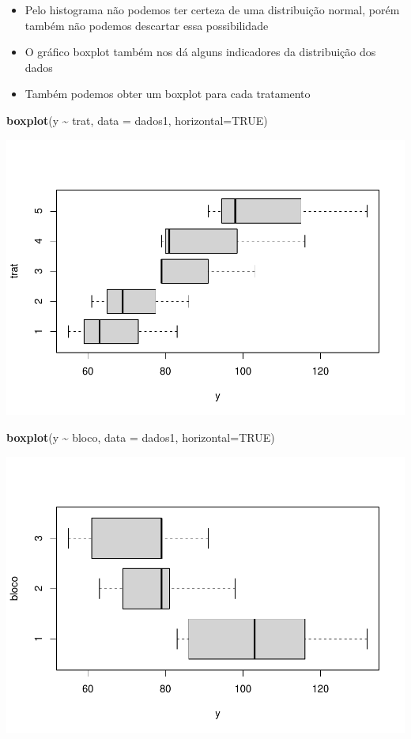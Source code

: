 \documentclass[
]{book}
\newenvironment{Shaded}{\begin{snugshade}}{\end{snugshade}}
\newcommand{\AttributeTok}[1]{\textcolor[rgb]{0.13,0.29,0.53}{#1}}
\newcommand{\ConstantTok}[1]{\textcolor[rgb]{0.56,0.35,0.01}{#1}}
\newcommand{\FunctionTok}[1]{\textcolor[rgb]{0.13,0.29,0.53}{\textbf{#1}}}
\newcommand{\NormalTok}[1]{#1}
\newcommand{\SpecialCharTok}[1]{\textcolor[rgb]{0.81,0.36,0.00}{\textbf{#1}}}
\begin{document}
\begin{itemize}
\item
  Pelo histograma não podemos ter certeza de uma distribuição normal, porém também não podemos descartar essa possibilidade
\item
  O gráfico boxplot também nos dá alguns indicadores da distribuição dos dados
\item
  Também podemos obter um boxplot para cada tratamento
\end{itemize}

\begin{Shaded}
\begin{Highlighting}[]
\FunctionTok{boxplot}\NormalTok{(y }\SpecialCharTok{\textasciitilde{}}\NormalTok{ trat, }\AttributeTok{data =}\NormalTok{ dados1, }\AttributeTok{horizontal=}\ConstantTok{TRUE}\NormalTok{)}
\end{Highlighting}
\end{Shaded}

\includegraphics{_main_files/figure-latex/box-1.pdf}

\begin{Shaded}
\begin{Highlighting}[]
\FunctionTok{boxplot}\NormalTok{(y }\SpecialCharTok{\textasciitilde{}}\NormalTok{ bloco, }\AttributeTok{data =}\NormalTok{ dados1, }\AttributeTok{horizontal=}\ConstantTok{TRUE}\NormalTok{)}
\end{Highlighting}
\end{Shaded}

\includegraphics{_main_files/figure-latex/box-2.pdf}
\end{document}
